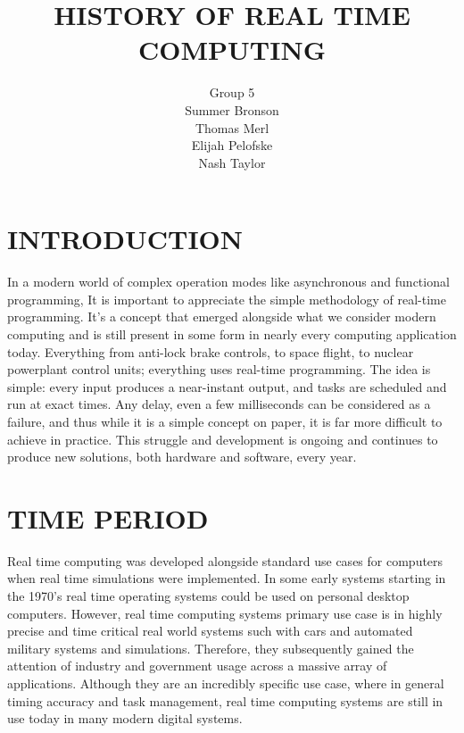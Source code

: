 \documentclass[letterpaper, 10 pt, conference]{IEEEconf}
\title{\LARGE \bf
HISTORY OF REAL TIME COMPUTING\\

}
\author{Group 5\\
\small Summer Bronson\\
\small Thomas Merl\\
\small Elijah Pelofske\\
\small Nash Taylor
}
\begin{document}
\maketitle
\thispagestyle{empty}
\pagestyle{empty}


\section{INTRODUCTION}

In a modern world of complex operation modes like asynchronous and functional programming, 
It is important to appreciate the simple methodology of real-time programming. It's a concept 
that emerged alongside what we consider modern computing and is still present in some form in nearly 
every computing application today. Everything from anti-lock brake controls, to space flight, to nuclear powerplant control units; 
everything uses real-time programming. The idea is simple: every input produces a near-instant output, and tasks are scheduled and 
run at exact times. Any delay, even a few milliseconds can be considered as a failure, and thus while it is a simple concept on paper, 
it is far more difficult to achieve in practice. This struggle and development is ongoing and continues to produce new solutions, both hardware and 
software, every year.

\section{TIME PERIOD}

Real time computing was developed alongside standard use cases for computers when real time simulations were implemented. In 
some early systems starting in the 1970's real time operating systems could be used on personal desktop computers. However, 
real time computing systems primary use case is in highly precise and time critical real world systems such with cars and 
automated military systems and simulations. Therefore, they subsequently gained the attention of industry and government 
usage across a massive array of applications. Although they are an incredibly specific use case, where in general timing 
accuracy and task management, real time computing systems are still in use today in many modern digital systems.

\end{document}
